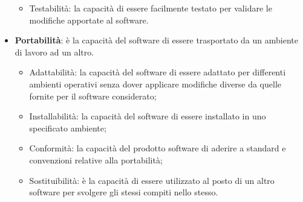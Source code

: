 \begin{itemize}
\begin{itemize}
\item Testabilità: la capacità di essere facilmente testato per validare le modifiche apportate al software.
\end{itemize}
\item \textbf{Portabilità}: è la capacità del software di essere trasportato da un ambiente di lavoro ad un altro.
\begin{itemize}
\item Adattabilità: la capacità del software di essere adattato per differenti ambienti operativi senza dover applicare modifiche diverse da quelle fornite per il software considerato;
\item Installabilità: la capacità del software di essere installato in uno specificato ambiente;
\item Conformità: la capacità del prodotto software di aderire a standard e convenzioni relative alla portabilità;
\item Sostituibilità: è la capacità di essere utilizzato al posto di un altro software per svolgere gli stessi compiti nello stesso.
\end{itemize}
\end{itemize}
